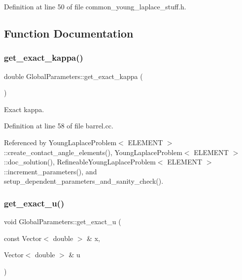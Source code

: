 Definition at line 50 of file common\+\_\+young\+\_\+laplace\+\_\+stuff.\+h.



\subsection{Function Documentation}
\mbox{\label{namespaceGlobalParameters_a4571d41514b16946dd31d075d44c5593}} 
\subsubsection{\texorpdfstring{get\+\_\+exact\+\_\+kappa()}{get\_exact\_kappa()}}
{\footnotesize\ttfamily double Global\+Parameters\+::get\+\_\+exact\+\_\+kappa (\begin{DoxyParamCaption}{ }\end{DoxyParamCaption})}



Exact kappa. 



Definition at line 58 of file barrel.\+cc.



Referenced by Young\+Laplace\+Problem$<$ E\+L\+E\+M\+E\+N\+T $>$\+::create\+\_\+contact\+\_\+angle\+\_\+elements(), Young\+Laplace\+Problem$<$ E\+L\+E\+M\+E\+N\+T $>$\+::doc\+\_\+solution(), Refineable\+Young\+Laplace\+Problem$<$ E\+L\+E\+M\+E\+N\+T $>$\+::increment\+\_\+parameters(), and setup\+\_\+dependent\+\_\+parameters\+\_\+and\+\_\+sanity\+\_\+check().

\mbox{\label{namespaceGlobalParameters_ae2320da6053f5527b2af5ebb362a8a07}} 
\subsubsection{\texorpdfstring{get\+\_\+exact\+\_\+u()}{get\_exact\_u()}}
{\footnotesize\ttfamily void Global\+Parameters\+::get\+\_\+exact\+\_\+u (\begin{DoxyParamCaption}\item[{const Vector$<$ double $>$ \&}]{x,  }\item[{Vector$<$ double $>$ \&}]{u }\end{DoxyParamCaption})}



